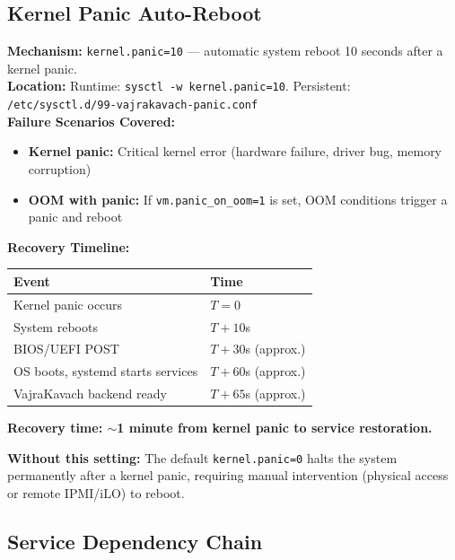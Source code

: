 \documentclass[11pt,a4paper]{article}
\begin{document}
\subsection{Kernel Panic Auto-Reboot}

\begin{tcolorbox}[colback=recoveryblue!5, colframe=recoveryblue]
\textbf{Mechanism:} \texttt{kernel.panic=10} — automatic system reboot 10 seconds after a kernel panic.\\
\textbf{Location:} Runtime: \texttt{sysctl -w kernel.panic=10}. Persistent: \texttt{/etc/sysctl.d/99-vajrakavach-panic.conf}\\
\textbf{Failure Scenarios Covered:}
\begin{itemize}[nosep]
  \item \textbf{Kernel panic:} Critical kernel error (hardware failure, driver bug, memory corruption)
  \item \textbf{OOM with panic:} If \texttt{vm.panic\_on\_oom=1} is set, OOM conditions trigger a panic and reboot
\end{itemize}
\textbf{Recovery Timeline:}
\begin{center}
\begin{tabular}{ll}
\toprule
\textbf{Event} & \textbf{Time} \\
\midrule
Kernel panic occurs & $T = 0$ \\
System reboots & $T + 10$s \\
BIOS/UEFI POST & $T + 30$s (approx.) \\
OS boots, systemd starts services & $T + 60$s (approx.) \\
VajraKavach backend ready & $T + 65$s (approx.) \\
\bottomrule
\end{tabular}
\end{center}
\textbf{Recovery time: $\sim$1 minute from kernel panic to service restoration.}

\textbf{Without this setting:} The default \texttt{kernel.panic=0} halts the system permanently after a kernel panic, requiring manual intervention (physical access or remote IPMI/iLO) to reboot.
\end{tcolorbox}

\subsection{Service Dependency Chain}
\end{document}
